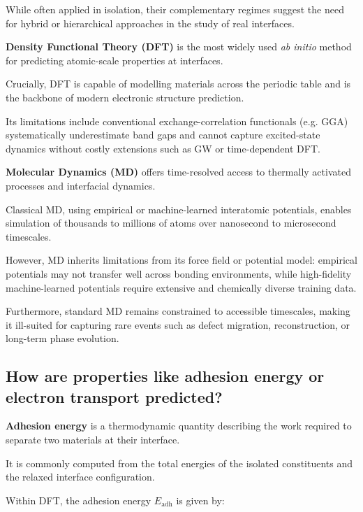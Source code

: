 While often applied in isolation, their complementary regimes suggest the need for hybrid or hierarchical approaches in
the study of real interfaces.


\textbf{Density Functional Theory (DFT)} is the most widely used \textit{ab initio} method for predicting atomic-scale
properties at interfaces.

Crucially, DFT is capable of modelling materials across the periodic table and is the backbone of modern electronic
structure prediction.

Its limitations include conventional exchange-correlation functionals (e.g. GGA) systematically underestimate band gaps
and cannot capture excited-state dynamics without costly extensions such as GW or time-dependent DFT.


\textbf{Molecular Dynamics (MD)} offers time-resolved access to thermally activated processes and interfacial dynamics.

Classical MD, using empirical or machine-learned interatomic potentials, enables simulation of thousands to millions of
atoms over nanosecond to microsecond timescales.

However, MD inherits limitations from its force field or potential model: empirical potentials may not transfer well
across bonding environments, while high-fidelity machine-learned potentials require extensive and chemically diverse
training data.

Furthermore, standard MD remains constrained to accessible timescales, making it ill-suited for capturing rare events
such as defect migration, reconstruction, or long-term phase evolution.


\subsection{How are properties like adhesion energy or electron transport predicted?}


\textbf{Adhesion energy} is a thermodynamic quantity describing the work required to separate two materials at their
interface.

It is commonly computed from the total energies of the isolated constituents and the relaxed interface configuration.

Within DFT, the adhesion energy $E_\mathrm{adh}$ is given by:

